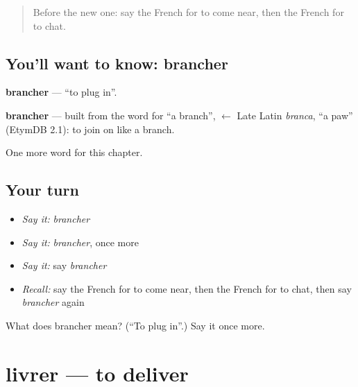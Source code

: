 \label{lesson:FR-C150-brancher}



\begin{quote}
Before the new one: say the French for to come near, then the French for to chat.
\end{quote}

\subsection*{You'll want to know: brancher}
\textbf{brancher} — \textquotedblleft{}to plug in\textquotedblright{}.

\begin{cousinweb}
\textbf{brancher} — built from the word for \textquotedblleft{}a branch\textquotedblright{}, $\leftarrow$ Late Latin \emph{branca}, \textquotedblleft{}a paw\textquotedblright{} (EtymDB 2.1): to join on like a branch.
\end{cousinweb}

\begin{grammarlens}[title={What you've built}]
One more word for this chapter.
\end{grammarlens}

\subsection*{Your turn}
\begin{itemize}
\raggedright
  \item \emph{Say it:} \emph{brancher}
  \item \emph{Say it:} \emph{brancher}, once more
  \item \emph{Say it:} say \emph{brancher}
  \item \emph{Recall:} say the French for to come near, then the French for to chat, then say \emph{brancher} again
\end{itemize}

\begin{tcolorbox}[breakable,colback=teal!4,colframe=teal!35!black,title={Before you move on}]
What does brancher mean? (\textquotedblleft{}To plug in\textquotedblright{}.) Say it once more.
\end{tcolorbox}
\section[livrer]{livrer — to deliver}

\label{lesson:FR-C150-livrer}



